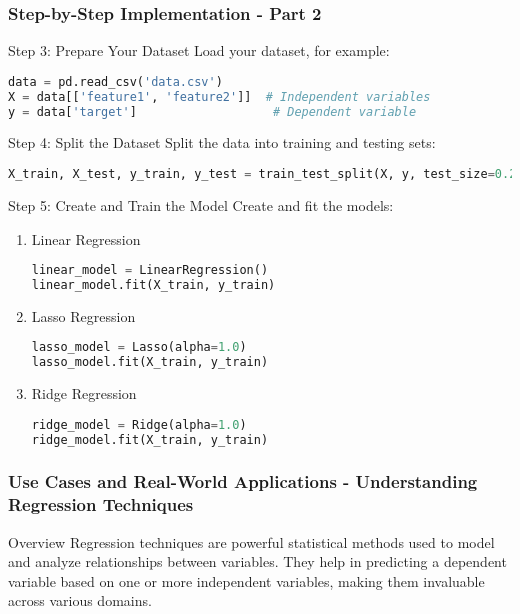 \documentclass[aspectratio=169]{beamer}
\begin{document}
\begin{frame}[fragile]
    \frametitle{Step-by-Step Implementation - Part 2}
    \begin{block}{Step 3: Prepare Your Dataset}
        Load your dataset, for example:
        \begin{lstlisting}[language=python]
data = pd.read_csv('data.csv')
X = data[['feature1', 'feature2']]  # Independent variables
y = data['target']                   # Dependent variable
        \end{lstlisting}
    \end{block}
    
    \begin{block}{Step 4: Split the Dataset}
        Split the data into training and testing sets:
        \begin{lstlisting}[language=python]
X_train, X_test, y_train, y_test = train_test_split(X, y, test_size=0.2, random_state=42)
        \end{lstlisting}
    \end{block}
    
    \begin{block}{Step 5: Create and Train the Model}
        Create and fit the models:
        \begin{enumerate}
            \item Linear Regression
            \begin{lstlisting}[language=python]
linear_model = LinearRegression()
linear_model.fit(X_train, y_train)
            \end{lstlisting}
            
            \item Lasso Regression
            \begin{lstlisting}[language=python]
lasso_model = Lasso(alpha=1.0)
lasso_model.fit(X_train, y_train)
            \end{lstlisting}
            
            \item Ridge Regression
            \begin{lstlisting}[language=python]
ridge_model = Ridge(alpha=1.0)
ridge_model.fit(X_train, y_train)
            \end{lstlisting}
        \end{enumerate}
    \end{block}
\end{frame}

\begin{frame}[fragile]
    \frametitle{Use Cases and Real-World Applications - Understanding Regression Techniques}
    \begin{block}{Overview}
        Regression techniques are powerful statistical methods used to model and analyze relationships between variables. They help in predicting a dependent variable based on one or more independent variables, making them invaluable across various domains.
    \end{block}
\end{frame}
\end{document}
